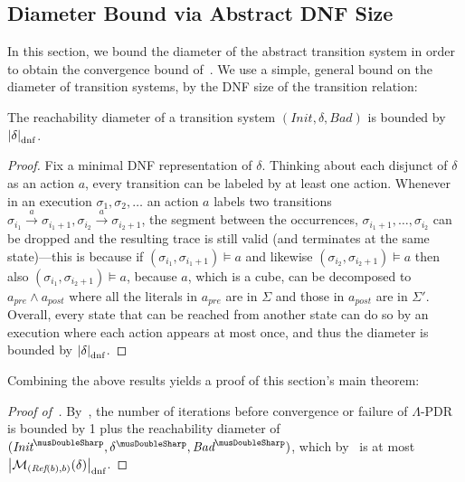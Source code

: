 \documentclass[acmsmall,screen]{acmart}
\newcommand{\card}[1]{{\left\vert{#1}\right\vert}} %
\newcommand{\vocabulary}{\Sigma}
\newcommand{\voc}{\vocabulary}
\newcommand{\Init}{{\textit{Init}}}
\newcommand{\Bad}{\textit{Bad}}
\newcommand{\tr}{\delta}
\newcommand{\dnfsize}[1]{\card{#1}_{\rm dnf}}
\newcommand{\monox}[2]{\mathcal{M}_{#2}({#1})}
\newcommand{\absr}[1]{{#1}^{\musDoubleSharp}}
\newcommand{\bkcube}{b}
\newcommand{\reflect}[1]{\textit{Ref}({#1})}
\begin{document}
\subsection{Diameter Bound via Abstract DNF Size}
\label{sec:diameter-bound}
In this section, we bound the diameter of the abstract transition system %
in order to obtain the convergence bound of~.
%
%
%
%
%
%
%
%
%
%
We use a simple, general bound on the diameter of transition systems\iflong, by the DNF size of the transition relation\fi:
\begin{lemma}
\label{lem:diam-dnf}
The reachability diameter of a transition system $(\Init,\tr,\Bad)$ is bounded by $\dnfsize{\tr}$.
%
\end{lemma}
\begin{proof}
Fix a minimal DNF representation of $\tr$. Thinking about each disjunct of $\tr$ as an action $a$, every transition can be labeled by at least one action. Whenever in an execution $\sigma_1,\sigma_2,\ldots$ an action $a$ labels two transitions $\sigma_{i_1} \overset{a}{\rightarrow} \sigma_{i_1+1},\sigma_{i_2} \overset{a}{\rightarrow} \sigma_{i_2+1}$, the segment between the occurrences, $\sigma_{i_1+1},\ldots,\sigma_{i_2}$ can be dropped and the resulting trace is still valid (and terminates at the same state)---this is because if $(\sigma_{i_1},\sigma_{i_1+1}) \models a$ and likewise $(\sigma_{i_2},\sigma_{i_2+1}) \models a$ then also $(\sigma_{i_1},\sigma_{i_2+1}) \models a$, because $a$, which is a cube, can be decomposed to $a_\textit{pre} \land a_\textit{post}$ where all the literals in $a_\textit{pre}$ are in $\voc$ and those in $a_\textit{post}$ are in $\voc'$.
Overall, every state that can be reached from another state can do so by an execution where each action appears at most once, and thus the diameter is bounded by $\dnfsize{\tr}$.
\end{proof}

%
%
%
%
%

%
%
%
%
%
%
%
%
%
%
%
%
%
%
%
%
%
%
%
%
%
%

%
%
%
%

Combining the above results yields a proof of this section's main theorem:
\begin{proof}[Proof of~]
%
By~, the number of iterations before convergence or failure of $\Lambda$-PDR is bounded by %
1 plus
the reachability diameter of $(\absr{\Init},\absr{\tr},\absr{\Bad})$,
which by~ is at most $\dnfsize{\monox{\tr}{(\reflect{\bkcube},\bkcube)}}$.
\end{proof}
%
%
%
%
%
%
%
%
%
%
%
%
%
%
%
%
%
%
%
%
%
\end{document}
